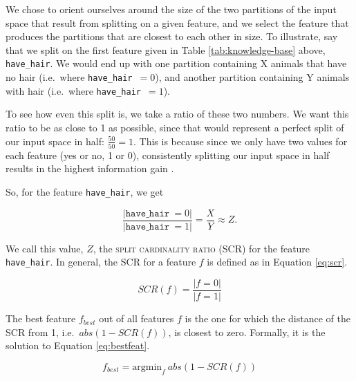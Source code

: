 \documentclass[11pt,a4paper]{article}
\newcommand{\havehair}{\texttt{have\_hair}}
\begin{document}
We chose to orient ourselves around the size of the two partitions of the input space that result from splitting on a given feature, and we select the feature that produces the partitions that are closest to each other in size.
To illustrate, say that we split on the first feature given in Table \ref{tab:knowledge-base} above, \havehair.
We would end up with one partition containing X animals that have no hair (i.e.\ where \havehair\ $= 0$), and another partition containing Y animals with hair (i.e.\ where \havehair\ $= 1$).

To see how even this split is, we take a ratio of these two numbers.
We want this ratio to be as close to 1 as possible, since that would represent a perfect split of our input space in half: $\frac{50}{50} = 1$.
This is because since we only have two values for each feature (yes or no, 1 or 0), consistently splitting our input space in half results in the highest information gain \citep[cf.][]{Quinlan1986, Bishop2006}.

So, for the feature \havehair, we get

$$\frac{|\havehair\ = 0|}{|\havehair\ = 1|} = \frac{X}{Y} \approx Z.$$

We call this value, $Z$, the \textsc{split cardinality ratio} (SCR) for the feature \havehair.
In general, the SCR for a feature $f$ is defined as in Equation \ref{eq:scr}.

\begin{equation}
SCR(f) = \frac{|f = 0|}{|f = 1|} 
\label{eq:scr}
\end{equation}

The best feature $f_{best}$ out of all features $f$ is the one for which the distance of the SCR from 1, i.e.\ $abs(1 - SCR(f))$, is closest to zero.
Formally, it is the solution to Equation \ref{eq:bestfeat}.

\begin{equation}
f_{best} = \text{argmin}_f\ abs(1 - SCR(f)) 
\label{eq:bestfeat}
\end{equation}



%
%
\end{document}
